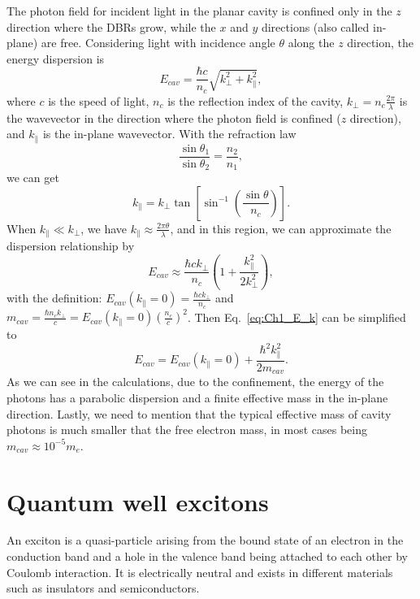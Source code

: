The photon field for incident light in the planar cavity is confined only in the $z$ direction where the DBRs grow, while the $x$ and $y$ directions (also called in-plane) are free.
Considering light with incidence angle $\theta$ along the $z$ direction, the energy dispersion is
\begin{equation}
    E_{cav} = \frac{\hbar c}{n_c}\sqrt{k_\bot^2 + k_\parallel^2},
    \label{eq:Ch1_disp_cav}
\end{equation}
where $c$ is the speed of light, $n_c$ is the reflection index of the cavity, $k_\bot=n_c\frac{2\pi}{\lambda}$ is the wavevector in the direction where the photon field is confined ($z$ direction), and $k_\parallel$ is the in-plane wavevector.
With the refraction law
\begin{equation}
    \frac{\sin \theta_1}{\sin \theta_2} = \frac{n_2}{n_1},
    \label{eq:Ch1_refraction}
\end{equation}
we can get
\begin{equation}
    k_\parallel = k_\bot\tan\left[ \sin^{-1}\left( \frac{\sin \theta}{n_c} \right) \right].
    \label{eq:Ch1_k_p}
\end{equation}
When $k_\parallel \ll k_\bot$, we have $k_\parallel \approx \frac{2\pi \theta}{\lambda}$, and in this region, we can approximate the dispersion relationship by
\begin{equation}
    E_{cav} \approx \frac{\hbar c k_\bot}{n_c}\left( 1 + \frac{k_\parallel^2}{2k_\bot^2}\right),
    \label{eq:Ch1_E_k}
\end{equation}
with the definition: $E_{cav}\left( k_\parallel=0 \right) = \frac{\hbar c k_\bot}{n_c}$ and $m_{cav} = \frac{\hbar n_c k_\bot}{c} = E_{cav}\left(k_\parallel=0\right)\left(\frac{n_c}{c}\right)^{2}$.
Then Eq.~\eqref{eq:Ch1_E_k} can be simplified to
\begin{equation}
    E_{cav} = E_{cav}\left( k_\parallel =0\right) + \frac{\hbar^2 k_\parallel^2}{2 m_{cav}}.
    \label{eq:Ch1_E_k_2}
\end{equation}
As we can see in the calculations, due to the confinement, the energy of the photons has a parabolic dispersion and a finite effective mass in the in-plane direction.
Lastly, we need to mention that the typical effective mass of cavity photons is much smaller that the free electron mass, in most cases being $m_{cav}\approx 10^{-5} m_e$.

\section{Quantum well excitons}\label{se:CH1_qw_ex}
An exciton is a quasi-particle arising from the bound state of an electron in the conduction band and a hole in the valence band being attached to each other by Coulomb interaction.
It is electrically neutral and exists in different materials such as insulators and semiconductors.


